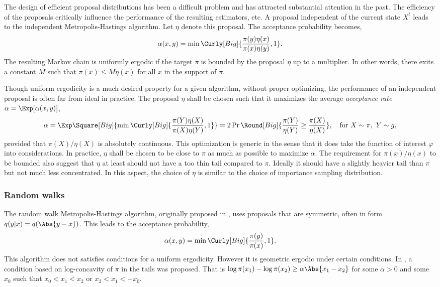 The design of efficient proposal distributions has been a difficult problem
and has attracted substantial attention in the past. The efficiency of the
proposals critically influence the performance of the resulting estimators,
etc. A proposal independent of the current state $X^t$ leads to the
independent Metropolis-Hastings algorithm. Let $\eta$ denote this proposal.
The acceptance probability becomes,
\begin{equation}
  \alpha(x,y) = \min\Curly[Big]{\frac{\pi(y)\eta(x)}{\pi(x)\eta(y)},1}.
\end{equation}
The resulting Markov chain is uniformly ergodic if the target $\pi$ is bounded
by the proposal $\eta$ up to a multiplier. In other words, there exits a
constant $M$ such that $\pi(x)\le M\eta(x)$ for all $x$ in the support of
$\pi$.

Though uniform ergodicity is a much desired property for a given algorithm,
without proper optimizing, the performance of an independent proposal is often
far from ideal in practice. The proposal $\eta$ shall be chosen such that it
maximizes the average \emph{acceptance rate} $\alpha = \Exp[\alpha(x,y)]$,
\begin{equation}
  \alpha
  = \Exp\Square[Big]{\min\Curly[Big]{\frac{\pi(Y)\eta(X)}{\pi(X)\eta(Y)},1}}
  = 2\Pr\Round[Big]{\frac{\pi(Y)}{\eta(Y)}\ge\frac{\pi(X)}{\eta(X)}},\quad
  \text{for } X\sim\pi,\ Y\sim g,
\end{equation}
provided that $\pi(X)/\eta(X)$ is absolutely continuous. This optimization is
generic in the sense that it does take the function of interest $\varphi$ into
considerations. In practice, $\eta$ shall be chosen to be close to $\pi$ as
much as possible to maximize $\alpha$. The requirement for $\pi(x)/\eta(x)$ to
be bounded also suggest that $\eta$ at least should not have a too thin tail
compared to $\pi$. Ideally it should have a slightly heavier tail than $\pi$
but not much less concentrated. In this aspect, the choice of $\eta$ is
similar to the choice of importance sampling distribution.

\subsubsection{Random walks}
\label{ssub:Random walks}

The random walk Metropolis-Hastings algorithm, originally proposed in
\cite{Metropolis:1953ex}, uses proposals that are symmetric, often in form
$q(y|x) = q(\Abs{y - x})$. This leads to the acceptance probability,
\begin{equation}
  \alpha(x,y) = \min\Curly[Big]{\frac{\pi(y)}{\pi(x)},1}.
\end{equation}
This algorithm does not satisfies conditions for a uniform ergodicity.
However it is geometric ergodic under certain conditions. In
\cite{Mengersen:1996th}, a condition based on log-concavity of $\pi$ in the
tails was proposed. That is $\log\pi(x_1) - \log\pi(x_2) \ge \alpha\Abs{x_1 -
  x_2}$ for some $\alpha > 0$ and some $x_0$ such that $x_0 < x_1 < x_2$ or
$x_2 < x_1 < -x_0$.

